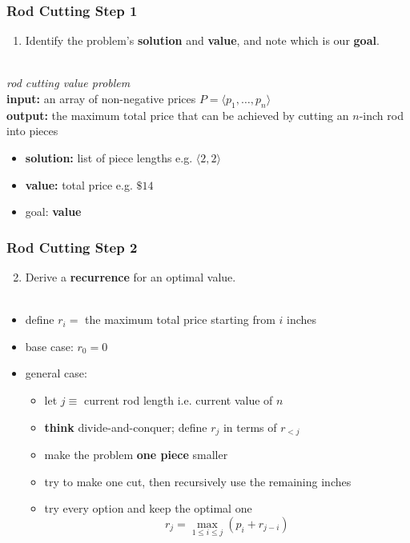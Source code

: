 \documentclass[10pt,aspectratio=169]{beamer}
\newcommand{\stanza}{ \\~\ }
\begin{document}
\begin{frame} \frametitle{Rod Cutting Step 1}
\begin{enumerate}
  \item Identify the problem's \textbf{solution} and \textbf{value}, and note which is our \textbf{goal}.
  \stanza
\end{enumerate}
\emph{rod cutting value problem} \\
\textbf{input:} an array of non-negative prices $P=\langle p_1, \ldots, p_n \rangle$ \\
\textbf{output:} the maximum total price that can be achieved by cutting an $n$-inch rod into pieces
\begin{itemize}
  \item \textbf{solution:} list of piece lengths e.g. $\langle 2, 2 \rangle$
  \item \textbf{value:} total price e.g. $\$14$
  \item goal: \textbf{value}
\end{itemize}
\end{frame}

\begin{frame} \frametitle{Rod Cutting Step 2}
  \begin{enumerate}
    \setcounter{enumi}{1}
    \item Derive a \textbf{recurrence} for an optimal value.
    \stanza
  \end{enumerate}

  \begin{itemize}
    \item define $r_i = $ the maximum total price starting from $i$ inches
    \item base case: $r_0 = 0$
    \item general case:
    \begin{itemize}
      \item let $j \equiv$ current rod length i.e. current value of $n$
      \item \textbf{think} divide-and-conquer; define $r_j$ in terms of $r_{<j}$
      \item make the problem \textbf{one piece} smaller
      \item try to make one cut, then recursively use the remaining inches
      \item try every option and keep the optimal one
      \[ r_j = \max_{1 \leq i \leq j} (p_i + r_{j-i}) \]
    \end{itemize}
  \end{itemize}
\end{frame}
  
\end{document}
